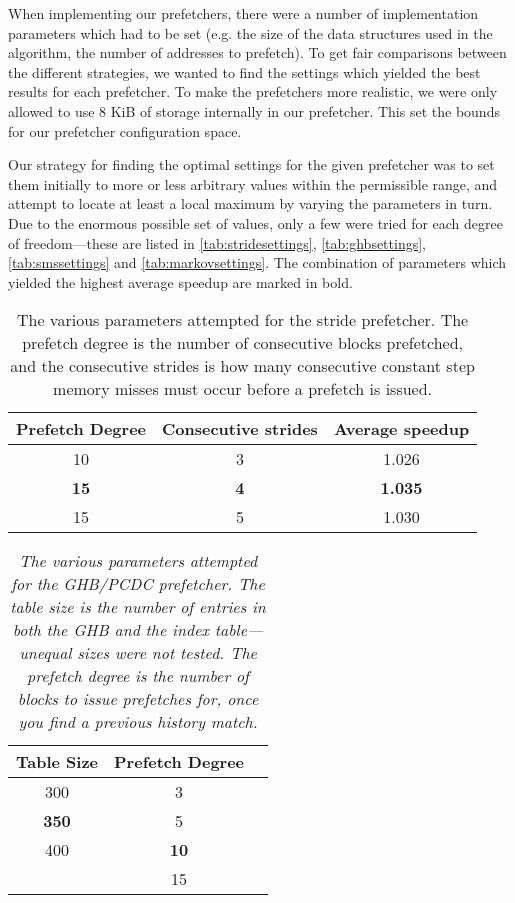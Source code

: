 When implementing our prefetchers, there were a number of
implementation parameters which had to be set (e.g. the size of the
data structures used in the algorithm, the number of addresses to
prefetch). To get fair comparisons between the different strategies,
we wanted to find the settings which yielded the best results for each
prefetcher. To make the prefetchers more realistic, we were only
allowed to use 8 KiB of storage internally in our prefetcher. This set
the bounds for our prefetcher configuration space. 

Our strategy for
finding the optimal settings for the given prefetcher was to set them
initially to more or less arbitrary values within the permissible
range, and attempt to locate at least a local maximum by
varying the parameters in turn. Due to the enormous possible set of
values, only a few were tried for each degree of freedom---these are
listed in \autoref{tab:stridesettings}, \autoref{tab:ghbsettings},
\autoref{tab:smssettings} and \autoref{tab:markovsettings}. The
combination of parameters which yielded the highest average speedup
are marked in bold.

\begin{table}[htbp]
  \centering
  \begin{tabular}{|c|c|c|}
    \hline
    \textbf{Prefetch Degree} & \textbf{Consecutive strides}  & \textbf{Average speedup}\\ \hline
    10 & 3 & 1.026\\ \hline
    \textbf{15} & \textbf{4} & \textbf{1.035}\\ \hline
    15 & 5 & 1.030\\ \hline %
  \end{tabular}
  \label{tab:stridesettings}
  \caption{The various parameters attempted for the stride prefetcher. The prefetch degree is the number of consecutive blocks prefetched, and the consecutive strides is how many consecutive constant step memory misses must occur before a prefetch is issued.}
\end{table}

\begin{table}[htbp]
  \caption{\emph{The various parameters attempted for the GHB/PCDC prefetcher. The table size is the number of entries in both the GHB and the index table---unequal sizes were not tested. The prefetch degree is the number of blocks to issue prefetches for, once you find a previous history match.}}
  \centering
  \begin{tabular}{|c|c|c|}
    \hline
    \textbf{Table Size} & \textbf{Prefetch Degree} \\ \hline
    300 & 3 \\ \hline
    \textbf{350} & 5 \\ \hline
    400 & \textbf{10} \\ \hline
        & 15 \\ \hline
  \end{tabular}
  \label{tab:ghbsettings}
\end{table}

